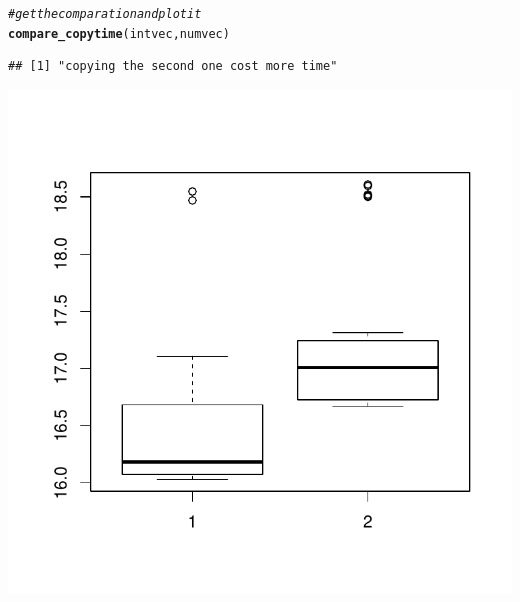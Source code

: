 \documentclass{article}\usepackage[]{graphicx}\usepackage[]{color}
\makeatletter
\def\maxwidth{ %
  \ifdim\Gin@nat@width>\linewidth
    \linewidth
  \else
    \Gin@nat@width
  \fi
}
\newcommand{\hlcom}[1]{\textcolor[rgb]{0.678,0.584,0.686}{\textit{#1}}}%
\newcommand{\hlstd}[1]{\textcolor[rgb]{0.345,0.345,0.345}{#1}}%
\newcommand{\hlkwd}[1]{\textcolor[rgb]{0.737,0.353,0.396}{\textbf{#1}}}%
\newenvironment{kframe}{%
 \def\at@end@of@kframe{}%
 \ifinner\ifhmode%
  \def\at@end@of@kframe{\end{minipage}}%
  \begin{minipage}{\columnwidth}%
 \fi\fi%
 \def\FrameCommand##1{\hskip\@totalleftmargin \hskip-\fboxsep
 \colorbox{shadecolor}{##1}\hskip-\fboxsep
     \hskip-\linewidth \hskip-\@totalleftmargin \hskip\columnwidth}%
 \MakeFramed {\advance\hsize-\width
   \@totalleftmargin\z@ \linewidth\hsize
   \@setminipage}}%
 {\par\unskip\endMakeFramed%
 \at@end@of@kframe}
\newenvironment{knitrout}{}{} %
\makeatother
\begin{document}
\begin{knitrout}
\begin{kframe}
\begin{alltt}
\hlcom{#get the comparation and plot it}
\hlkwd{compare_copytime}\hlstd{(intvec,numvec)}
\end{alltt}
\begin{verbatim}
## [1] "copying the second one cost more time"
\end{verbatim}
\end{kframe}
\includegraphics[width=\maxwidth]{figure/r-chunk2-1} 

\end{knitrout}
\end{document}

